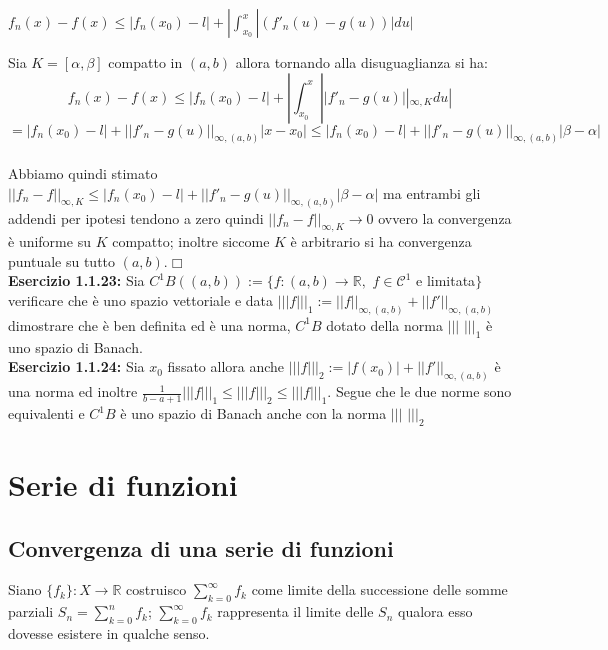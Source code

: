 \documentclass[a4paper,11pt,titlepage]{book}
\begin{document}
\begin{center}
$f_{n}(x)-f(x)\leq |f_{n}(x_0)-l|+|\int_{x_0}^{x}|(f'_{n}(u)-g(u))|du|$
\end{center}

Sia $K=[\alpha,\beta]$ compatto in $(a,b)$ allora tornando alla disuguaglianza si ha:\\

$$f_{n}(x)-f(x)\leq |f_{n}(x_0)-l|+|\int_{x_0}^{x}||f'_{n}-g(u)||_{\infty,K}du|$$ $$=|f_{n}(x_0)-l|+||f'_{n}-g(u)||_{\infty,(a,b)}|x-x_0|\leq|f_{n}(x_0)-l|+||f'_{n}-g(u)||_{\infty,(a,b)}|\beta - \alpha|$$\\


Abbiamo quindi stimato $||f_{n}-f||_{\infty,K}\leq|f_{n}(x_0)-l|+||f'_{n}-g(u)||_{\infty,(a,b)}|\beta - \alpha|$ ma entrambi gli addendi per ipotesi tendono a zero quindi $||f_{n}-f||_{\infty,K}\rightarrow 0$ ovvero la convergenza è uniforme su $K$ compatto; inoltre siccome $K$ è arbitrario si ha convergenza puntuale su tutto $(a,b)$.$\Box$\\

\textbf{Esercizio 1.1.23:} Sia $C^1B((a,b)):=\{f:(a,b)\rightarrow\mathbb{R},$  $f\in\mathcal{C}^1$ e limitata$\}$ verificare che è uno spazio vettoriale e data $|||f|||_1:=||f||_{\infty,(a,b)}+||f'||_{\infty,(a,b)}$ dimostrare che è ben definita ed è una norma, $C^1B$ dotato della norma $|||$ $|||_1$ è uno spazio di Banach.\\

\textbf{Esercizio 1.1.24:} Sia $x_0$ fissato allora anche $|||f|||_2:=|f(x_0)|+||f'||_{\infty,(a,b)}$ è una norma ed inoltre $\frac{1}{b-a+1}|||f|||_1\leq |||f|||_2 \leq |||f|||_1$. Segue che le due norme sono equivalenti e $C^1B$ è uno spazio di Banach anche con la norma $|||$ $|||_2$

\section{Serie di funzioni}

\subsection{Convergenza di una serie di funzioni}

Siano $\{f_{k}\}:X\rightarrow\mathbb{R}$ costruisco $\sum_{k=0}^\infty f_{k}$ come limite della successione delle somme parziali  $S_n=\sum_{k=0}^{n}f_k$; $\sum_{k=0}^\infty f_{k}$ rappresenta il limite delle $S_n$ qualora esso dovesse esistere in qualche senso.\\
\end{document}
